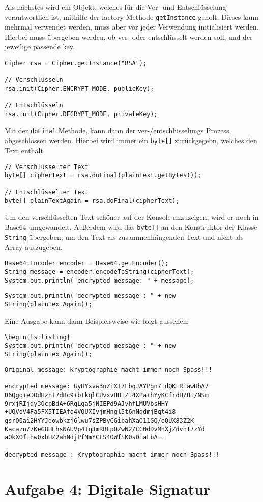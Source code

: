 \documentclass[12pt]{article}
\begin{document}
Als nächstes wird ein Objekt, welches für die Ver- und Entschlüsselung verantwortlich ist, mithilfe der factory Methode \texttt{getInstance} geholt. Dieses kann mehrmal verwendet werden, muss aber vor jeder Verwendung initialisiert werden. Hierbei muss übergeben werden, ob ver- oder entschlüsselt werden soll, und der jeweilige passende key.

\begin{lstlisting}
Cipher rsa = Cipher.getInstance("RSA");

// Verschlüsseln
rsa.init(Cipher.ENCRYPT_MODE, publicKey);

// Entschlüsseln
rsa.init(Cipher.DECRYPT_MODE, privateKey);
\end{lstlisting}

Mit der \texttt{doFinal} Methode, kann dann der ver-/entschlüsselungs Prozess abgeschlossen werden. Hierbei wird immer ein \texttt{byte[]} zurückgegebn, welches den Text enthält.

\begin{lstlisting}
// Verschlüsselter Text
byte[] cipherText = rsa.doFinal(plainText.getBytes());

// Entschlüsselter Text
byte[] plainTextAgain = rsa.doFinal(cipherText);
\end{lstlisting}

Um den verschlüsselten Text schöner auf der Konsole anzuzeigen, wird er noch in Base64 umgewandelt. Außerdem wird das \texttt{byte[]} an den Konstruktor der Klasse \texttt{String} übergeben, um den Text als zusammenhängenden Text und nicht als Array auszugeben.

\begin{lstlisting}
Base64.Encoder encoder = Base64.getEncoder();
String message = encoder.encodeToString(cipherText);
System.out.println("encrypted message: " + message);
\end{lstlisting}

\begin{lstlisting}
System.out.println("decrypted message : " + new String(plainTextAgain));
\end{lstlisting}

Eine Ausgabe kann dann Beispielsweise wie folgt aussehen:
\begin{lstlisting}
\begin{lstlisting}
System.out.println("decrypted message : " + new String(plainTextAgain));
\end{lstlisting}

\begin{lstlisting}
Original message: Kryptographie macht immer noch Spass!!!

encrypted message: GyHYxvw3nZiXt7LbqJAYPgn7idQKFRiawHbA7
D6Qgq+eDOdHznt7dBc9+bTkqlCUvxvHUTZt4XPa+hYyKCfrdH/UI/NSm
9rxjRIjdy3OcpBdA+6RqLga5jNIEPd9AJvhfLMUVbsHHY
+UQVoV4Fa5FX5TIEAfo4VQUXIvjmHngl5t6nNqdmjBqt4i8
gsrO0ai2HYYJdowbkzj6lwu7sZPByCGibahXaO11GQ/eQUX83Z2K
Kacazn/7KeG8HLhsNAUVp4TqJmRBEpOZwN2/CC0dDvMhXjZdvhI7zYd
aOkXOf+hw0xbHZ2ahNdjPfMmYCLS4OWfSK0sDiaLbA==

decrypted message : Kryptographie macht immer noch Spass!!!
\end{lstlisting}

\section{Aufgabe 4: Digitale Signatur}
\end{document}
